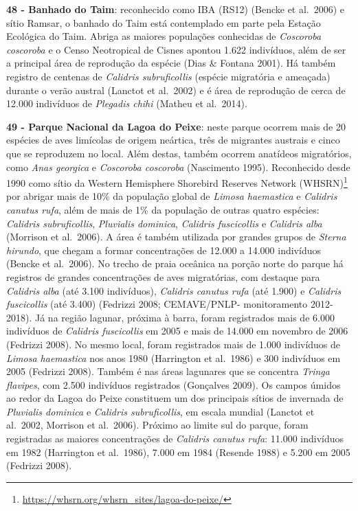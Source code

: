 \documentclass[
  oneside]{scrbook}
\DeclareRobustCommand{\href}[2]{#2\footnote{\url{#1}}}
\begin{document}
\textbf{48 - Banhado do Taim}: reconhecido como IBA (RS12) (Bencke et al.~2006) e sítio Ramsar, o banhado do Taim está contemplado em parte pela Estação Ecológica do Taim. Abriga as maiores populações conhecidas de \emph{Coscoroba coscoroba} e o Censo Neotropical de Cisnes apontou 1.622 indivíduos, além de ser a principal área de reprodução da espécie (Dias \& Fontana 2001). Há também registro de centenas de \emph{Calidris subruficollis} (espécie migratória e ameaçada) durante o verão austral (Lanctot et al.~2002) e é área de reprodução de cerca de 12.000 indivíduos de \emph{Plegadis chihi} (Matheu et al.~2014).

\textbf{49 - Parque Nacional da Lagoa do Peixe}: neste parque ocorrem mais de 20 espécies de aves limícolas de origem neártica, três de migrantes austrais e cinco que se reproduzem no local. Além destas, também ocorrem anatídeos migratórios, como \emph{Anas georgica} e \emph{Coscoroba coscoroba} (Nascimento 1995). Reconhecido desde 1990 como \href{https://whsrn.org/whsrn_sites/lagoa-do-peixe/}{sítio da Western Hemisphere Shorebird Reserves Network (WHSRN)} por abrigar mais de 10\% da população global de \emph{Limosa haemastica} e \emph{Calidris canutus rufa}, além de mais de 1\% da população de outras quatro espécies: \emph{Calidris subruficollis}, \emph{Pluvialis dominica}, \emph{Calidris fuscicollis} e \emph{Calidris alba} (Morrison et al.~2006). A área é também utilizada por grandes grupos de \emph{Sterna hirundo}, que chegam a formar concentrações de 12.000 a 14.000 indivíduos (Bencke et al.~2006). No trecho de praia oceânica na porção norte do parque há registros de grandes concentrações de aves migratórias, com destaque para \emph{Calidris alba} (até 3.100 indivíduos), \emph{Calidris canutus rufa} (até 1.900) e \emph{Calidris fuscicollis} (até 3.400) (Fedrizzi 2008; CEMAVE/PNLP- monitoramento 2012-2018). Já na região lagunar, próxima à barra, foram registrados mais de 6.000 indivíduos de \emph{Calidris fuscicollis} em 2005 e mais de 14.000 em novembro de 2006 (Fedrizzi 2008). No mesmo local, foram registrados mais de 1.000 indivíduos de \emph{Limosa haemastica} nos anos 1980 (Harrington et al.~1986) e 300 indivíduos em 2005 (Fedrizzi 2008). Também é nas áreas lagunares que se concentra \emph{Tringa flavipes}, com 2.500 indivíduos registrados (Gonçalves 2009). Os campos úmidos ao redor da Lagoa do Peixe constituem um dos principais sítios de invernada de \emph{Pluvialis dominica} e \emph{Calidris subruficollis}, em escala mundial (Lanctot et al.~2002, Morrison et al.~2006). Próximo ao limite sul do parque, foram registradas as maiores concentrações de \emph{Calidris canutus rufa}: 11.000 indivíduos em 1982 (Harrington et al.~1986), 7.000 em 1984 (Resende 1988) e 5.200 em 2005 (Fedrizzi 2008).
\end{document}
